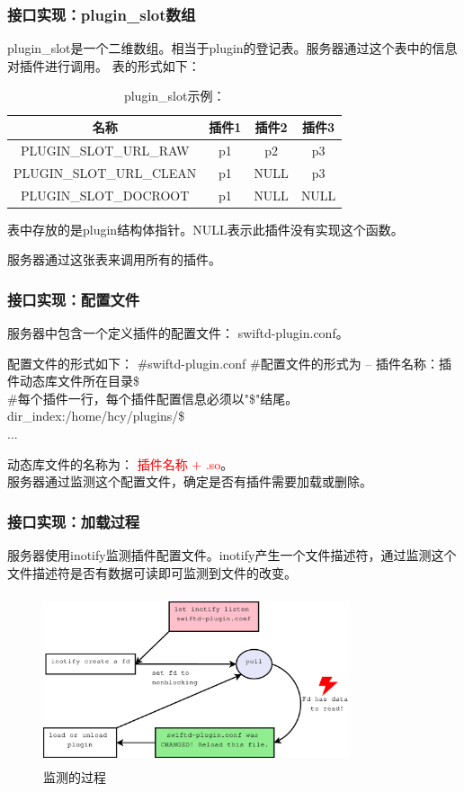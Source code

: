 \documentclass[10pt,dvipdfm]{beamer}
\begin{document}
\begin{frame}
	\frametitle{接口实现：plugin\_slot数组}
	plugin\_slot是一个二维数组。相当于plugin的登记表。服务器通过这个表中的信息对插件进行调用。
	表的形式如下：
	\begin{table}[htbp]
	\caption{plugin\_slot示例：}
	\centering
	\begin{tabular}{cccc} %
	\toprule
	\centering 名称 & 插件1 & 插件2 &插件3\\
	\midrule
	\centering PLUGIN\_SLOT\_URL\_RAW & p1 &  p2 & p3\\
	\centering PLUGIN\_SLOT\_URL\_CLEAN &  p1 &  NULL & p3\\
	\centering PLUGIN\_SLOT\_DOCROOT & p1 & NULL & NULL\\
	\bottomrule
	\end{tabular}
	\end{table}
		
	表中存放的是plugin结构体指针。NULL表示此插件没有实现这个函数。
	
	服务器通过这张表来调用所有的插件。
\end{frame}

\begin{frame}
	\frametitle{接口实现：配置文件}
	服务器中包含一个定义插件的配置文件： swiftd-plugin.conf。
	
	\begin{block}{配置文件的形式如下：}	
		\#swiftd-plugin.conf
		\#配置文件的形式为  -- 插件名称：插件动态库文件所在目录\$\\
		\#每个插件一行，每个插件配置信息必须以"\$"结尾。\\
		dir\_index:/home/hcy/plugins/\$\\
		...
	\end{block}
	
	\pause
	
	\begin{block}{}
	动态库文件的名称为： \textcolor{red}{插件名称 + .so}。\\
	服务器通过监测这个配置文件，确定是否有插件需要加载或删除。
	\end{block}
\end{frame}

\begin{frame}
	\frametitle{接口实现：加载过程}
	服务器使用inotify监测插件配置文件。inotify产生一个文件描述符，通过监测这个文件描述符是否有数据可读即可监测到文件的改变。
	\begin{figure}[htbp]
	\centering
	\includegraphics[height=5cm, width=9cm]{pics/inotify.eps}
	\caption{监测的过程}
	\end{figure}
\end{frame}
\end{document}
